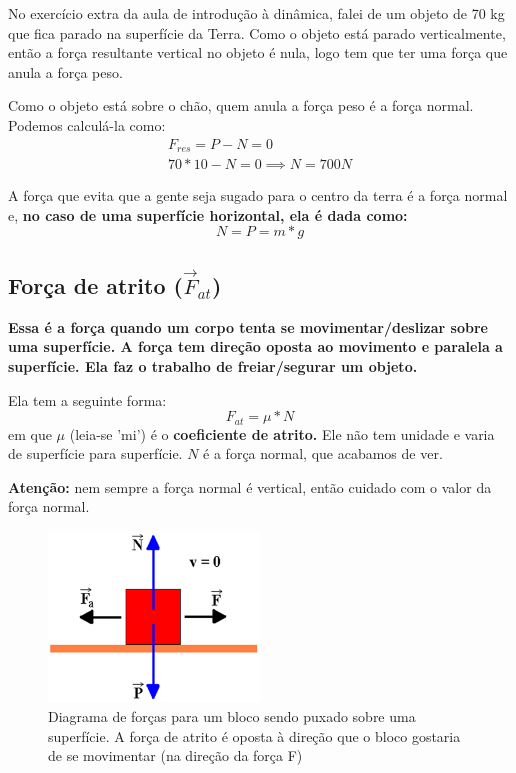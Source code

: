 \documentclass[12pt]{extarticle}
\newcommand{\<}{\langle}
\renewcommand{\>}{\rangle}
\theoremstyle{definition}
\begin{document}
No exercício extra da aula de introdução à dinâmica, falei de um objeto de 70 kg que fica parado na superfície da Terra. Como o objeto está parado verticalmente, então a força resultante vertical no objeto é nula, logo tem que ter uma força que anula a força peso.

Como o objeto está sobre o chão, quem anula a força peso é a força normal. Podemos calculá-la como:
\begin{align*}
    F_{res} = P - N = 0\\
    70*10 - N =0 \implies N = 700 N
\end{align*}

A força que evita que a gente seja sugado para o centro da terra é a força normal e, \textbf{no caso de uma superfície horizontal, ela é dada como:}
\begin{equation}
    N = P = m*g
\end{equation}

\subsection{Força de atrito ($\vec{F}_{at}$)}

\textbf{Essa é a força quando um corpo tenta se movimentar/deslizar sobre uma superfície. A força tem direção oposta ao movimento e paralela a superfície. Ela faz o trabalho de freiar/segurar um objeto.}

Ela tem a seguinte forma:
\begin{equation}
    F_{at} = \mu *N
\end{equation}
\noindent em que $\mu$ (leia-se 'mi') é o \textbf{coeficiente de atrito.} Ele não tem unidade e varia de superfície para superfície. $N$ é a força normal, que acabamos de ver.

\textbf{Atenção:} nem sempre a força normal é vertical, então cuidado com o valor da força normal.

\begin{figure}[h]
    \centering
    \includegraphics[width=0.5\textwidth]{bloco-parado.jpg}
    \caption{Diagrama de forças para um bloco sendo puxado sobre uma superfície. A força de atrito é oposta à direção que o bloco gostaria de se movimentar (na direção da força F)}
    \label{fig:my_label}
\end{figure}
\end{document}
